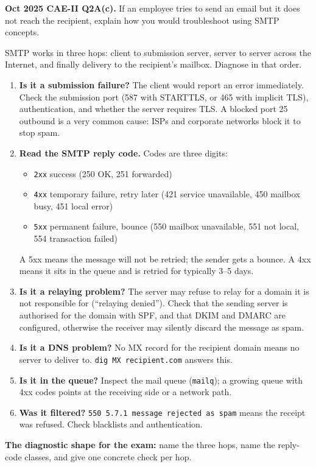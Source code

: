 \documentclass[11pt,a4paper]{article}
\begin{document}
\begin{pyqbox}
\textbf{Oct 2025 CAE-II Q2A(c).} If an employee tries to send an email but it does not reach the recipient, explain how you would troubleshoot using SMTP concepts.
\end{pyqbox}

\begin{solbox}
SMTP works in three hops: client to submission server, server to server across the Internet, and finally delivery to the recipient's mailbox. Diagnose in that order.

\begin{enumerate}
\item \textbf{Is it a submission failure?} The client would report an error immediately. Check the submission port (587 with STARTTLS, or 465 with implicit TLS), authentication, and whether the server requires TLS. A blocked port 25 outbound is a very common cause: ISPs and corporate networks block it to stop spam.
\item \textbf{Read the SMTP reply code.} Codes are three digits:
\begin{itemize}
\item \texttt{2xx} success (250 OK, 251 forwarded)
\item \texttt{4xx} temporary failure, retry later (421 service unavailable, 450 mailbox busy, 451 local error)
\item \texttt{5xx} permanent failure, bounce (550 mailbox unavailable, 551 not local, 554 transaction failed)
\end{itemize}
A 5xx means the message will not be retried; the sender gets a bounce. A 4xx means it sits in the queue and is retried for typically 3--5 days.
\item \textbf{Is it a relaying problem?} The server may refuse to relay for a domain it is not responsible for (``relaying denied''). Check that the sending server is authorised for the domain with SPF, and that DKIM and DMARC are configured, otherwise the receiver may silently discard the message as spam.
\item \textbf{Is it a DNS problem?} No MX record for the recipient domain means no server to deliver to. \texttt{dig MX recipient.com} answers this.
\item \textbf{Is it in the queue?} Inspect the mail queue (\texttt{mailq}); a growing queue with 4xx codes points at the receiving side or a network path.
\item \textbf{Was it filtered?} \texttt{550 5.7.1 message rejected as spam} means the receipt was refused. Check blacklists and authentication.
\end{enumerate}

\textbf{The diagnostic shape for the exam:} name the three hops, name the reply-code classes, and give one concrete check per hop.
\end{solbox}
\end{document}
